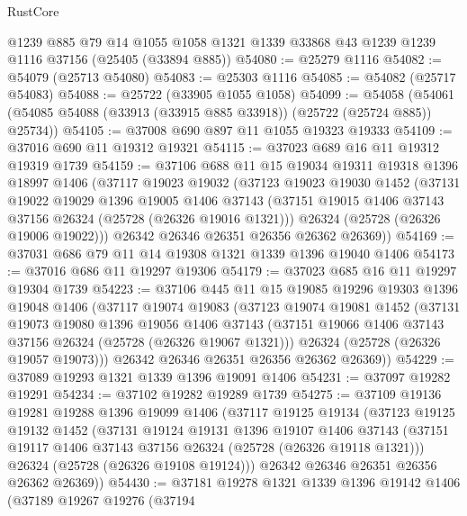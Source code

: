 \begin{lexlean}{RustCore}
\begin{coremodule}
    @1239
    @885
    @79
    @14
    @1055
    @1058
    @1321
    @1339
    @33868
    @43
    @1239
    @1239
    @1116
    @37156
    (@25405 (@33894 @885))
@54080 := @25279 @1116
@54082 := @54079 (@25713 @54080)
@54083 := @25303 @1116
@54085 := @54082 (@25717 @54083)
@54088 := @25722 (@33905 @1055 @1058)
@54099 := @54058
    (@54061 (@54085 @54088 (@33913 (@33915 @885 @33918)) (@25722 (@25724 @885)) @25734))
@54105 := @37008 @690 @897 @11 @1055 @19323 @19333
@54109 := @37016 @690 @11 @19312 @19321
@54115 := @37023 @689 @16 @11 @19312 @19319 @1739
@54159 := @37106
    @688
    @11
    @15
    @19034
    @19311
    @19318
    @1396
    @18997
    @1406
    (@37117
      @19023
      @19032
      (@37123
        @19023
        @19030
        @1452
        (@37131
          @19022
          @19029
          @1396
          @19005
          @1406
          @37143
          (@37151 @19015 @1406 @37143 @37156 @26324 (@25728 (@26326 @19016 @1321)))
          @26324
          (@25728 (@26326 @19006 @19022)))
        @26342
        @26346
        @26351
        @26356
        @26362
        @26369))
@54169 := @37031 @686 @79 @11 @14 @19308 @1321 @1339 @1396 @19040 @1406
@54173 := @37016 @686 @11 @19297 @19306
@54179 := @37023 @685 @16 @11 @19297 @19304 @1739
@54223 := @37106
    @445
    @11
    @15
    @19085
    @19296
    @19303
    @1396
    @19048
    @1406
    (@37117
      @19074
      @19083
      (@37123
        @19074
        @19081
        @1452
        (@37131
          @19073
          @19080
          @1396
          @19056
          @1406
          @37143
          (@37151 @19066 @1406 @37143 @37156 @26324 (@25728 (@26326 @19067 @1321)))
          @26324
          (@25728 (@26326 @19057 @19073)))
        @26342
        @26346
        @26351
        @26356
        @26362
        @26369))
@54229 := @37089 @19293 @1321 @1339 @1396 @19091 @1406
@54231 := @37097 @19282 @19291
@54234 := @37102 @19282 @19289 @1739
@54275 := @37109
    @19136
    @19281
    @19288
    @1396
    @19099
    @1406
    (@37117
      @19125
      @19134
      (@37123
        @19125
        @19132
        @1452
        (@37131
          @19124
          @19131
          @1396
          @19107
          @1406
          @37143
          (@37151 @19117 @1406 @37143 @37156 @26324 (@25728 (@26326 @19118 @1321)))
          @26324
          (@25728 (@26326 @19108 @19124)))
        @26342
        @26346
        @26351
        @26356
        @26362
        @26369))
@54430 := @37181
    @19278
    @1321
    @1339
    @1396
    @19142
    @1406
    (@37189
      @19267
      @19276
      (@37194

\end{coremodule}
\end{lexlean}
